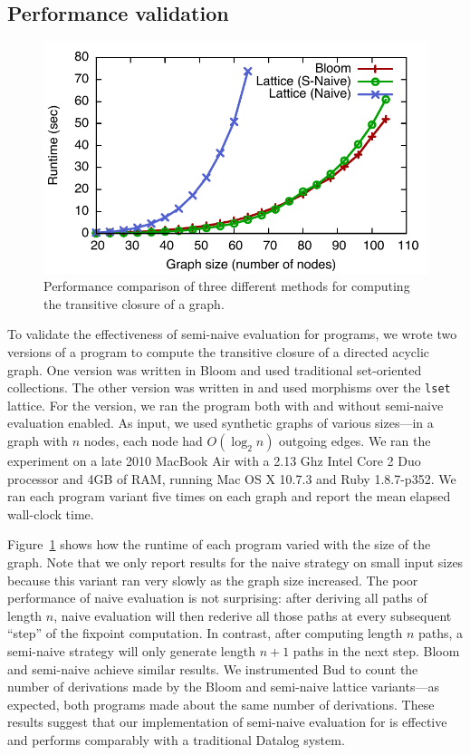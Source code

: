 \subsection{Performance validation}
\label{sec:lattice-perf}


\begin{figure}[t]
\includegraphics[width=\linewidth]{fig/sn_perf}
\caption{Performance comparison of three different methods for computing the
  transitive closure of a graph.}
\label{fig:tc-perf-graph}
\end{figure}

To validate the effectiveness of semi-naive evaluation for \lang programs, we
wrote two versions of a program to compute the transitive closure of a directed
acyclic graph. One version was written in Bloom and used traditional
set-oriented collections. The other version was written in \lang and used
morphisms over the \texttt{lset} lattice. For the \lang version, we ran the
program both with and without semi-naive evaluation enabled. As input, we used
synthetic graphs of various sizes---in a graph with $n$ nodes, each node had
$O(\log_2 n)$ outgoing edges. We ran the experiment on a late 2010 MacBook Air
with a 2.13 Ghz Intel Core 2 Duo processor and 4GB of RAM, running Mac OS X
10.7.3 and Ruby 1.8.7-p352. We ran each program variant five times on each graph
and report the mean elapsed wall-clock time.

Figure~\ref{fig:tc-perf-graph} shows how the runtime of each program varied with
the size of the graph. Note that we only report results for the naive \lang
strategy on small input sizes because this variant ran very slowly as the graph
size increased. The poor performance of naive evaluation is not surprising:
after deriving all paths of length $n$, naive evaluation will then rederive all
those paths at every subsequent ``step'' of the fixpoint computation. In
contrast, after computing length $n$ paths, a semi-naive strategy will only
generate length $n+1$ paths in the next step. Bloom and semi-naive \lang achieve
similar results. We instrumented Bud to count the number of derivations made by
the Bloom and semi-naive lattice variants---as expected, both programs made about
the same number of derivations. These results suggest that our implementation of
semi-naive evaluation for \lang is effective and performs comparably with a
traditional Datalog system.

